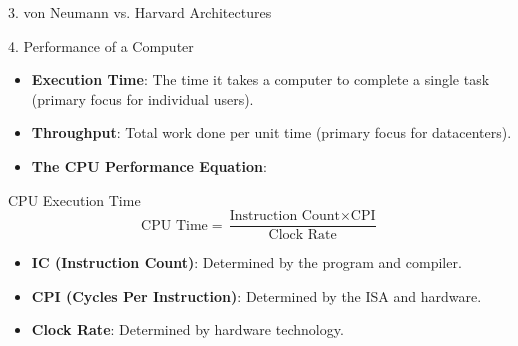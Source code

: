 \documentclass[aspectratio=169]{beamer}
\begin{document}
\begin{frame}{3. von Neumann vs. Harvard Architectures}
\begin{table}[]
\end{table}
\end{frame}

\begin{frame}{4. Performance of a Computer}
\begin{itemize}
    \item \textbf{Execution Time}: The time it takes a computer to complete a single task (primary focus for individual users).
    \item \textbf{Throughput}: Total work done per unit time (primary focus for datacenters).
    \item \textbf{The CPU Performance Equation}:
\end{itemize}
\begin{block}{CPU Execution Time}
$$ \text{CPU Time} = \frac{\text{Instruction Count} \times \text{CPI}}{\text{Clock Rate}} $$
\end{block}
\begin{itemize}
    \item \textbf{IC (Instruction Count)}: Determined by the program and compiler.
    \item \textbf{CPI (Cycles Per Instruction)}: Determined by the ISA and hardware.
    \item \textbf{Clock Rate}: Determined by hardware technology.
\end{itemize}
\end{frame}
\end{document}
